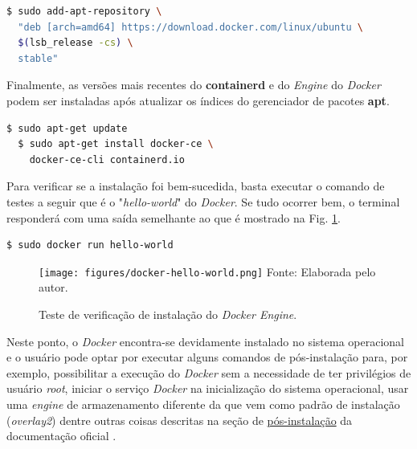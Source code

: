 \documentclass[
  12pt,				%
  openright,			%
  twoside,			%
  a4paper,			%
  english,			%
  french,				%
  spanish,			%
  brazil,				%
  ]{abntex2}
\begin{document}
\begin{adjustbox}{max width=\linewidth}
  \begin{lstlisting}[language=bash]
  $ sudo add-apt-repository \
  "deb [arch=amd64] https://download.docker.com/linux/ubuntu \
  $(lsb_release -cs) \
  stable"
\end{lstlisting}
\end{adjustbox}


Finalmente, as versões mais recentes do \textbf{containerd} e do \textit{Engine} do \textit{Docker} podem ser instaladas após atualizar os índices do
gerenciador de pacotes \textbf{apt}.

\begin{adjustbox}{max width=\linewidth}
  \begin{lstlisting}[language=bash]
  $ sudo apt-get update
  $ sudo apt-get install docker-ce \
    docker-ce-cli containerd.io
\end{lstlisting}
\end{adjustbox}

Para verificar se a instalação foi bem-sucedida, basta executar o comando de testes a seguir que é o "\textit{hello-world}" do \textit{Docker}. Se tudo ocorrer bem,
o terminal responderá com uma saída semelhante ao que é mostrado na Fig. \ref{fig:docker-hello-world}.

\begin{adjustbox}{max width=\linewidth}
  \begin{lstlisting}[language=bash]
  $ sudo docker run hello-world
\end{lstlisting}
\end{adjustbox}

\begin{figure}[!htb]
  \centering
  \caption{Teste de verificação de instalação do \textit{Docker Engine}.}
  \texttt{[image: figures/docker-hello-world.png]}
  Fonte: Elaborada pelo autor.
  \label{fig:docker-hello-world}
\end{figure}

Neste ponto, o \textit{Docker} encontra-se devidamente instalado no sistema operacional e o usuário pode optar por executar alguns comandos de pós-instalação
para, por exemplo, possibilitar a execução do \textit{Docker} sem a necessidade de ter privilégios de usuário \textit{root}, iniciar o serviço \textit{Docker} na inicialização do
sistema operacional, usar uma \textit{engine} de armazenamento diferente da que vem como padrão de instalação (\textit{overlay2}) dentre outras coisas descritas
na seção de \href{https://docs.docker.com/engine/install/linux-postinstall/}{pós-instalação} da documentação oficial \cite{Docker:post-installation-2020}.
\end{document}

